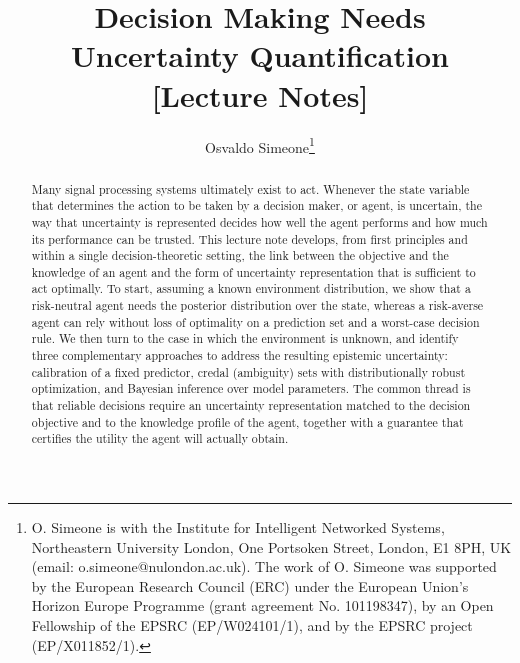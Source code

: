 \documentclass[journal]{IEEEtran}
\theoremstyle{definition}
\theoremstyle{remark}
\begin{document}
\title{Decision Making Needs Uncertainty Quantification [Lecture Notes]}
\author{Osvaldo Simeone\thanks{O. Simeone is with the Institute for Intelligent Networked Systems, Northeastern University London, One Portsoken Street, London, E1 8PH, UK (email:  o.simeone@nulondon.ac.uk). The work of O. Simeone was supported by the European Research Council (ERC) under the European Union’s Horizon Europe Programme (grant agreement No. 101198347), by an Open Fellowship of the EPSRC (EP/W024101/1), and by the EPSRC project (EP/X011852/1). }}


\maketitle

\begin{abstract}
Many signal processing systems ultimately exist to {act}. Whenever the state variable that
determines the action to be taken by a decision maker, or agent, is uncertain, the way that uncertainty is
represented decides how
well the agent performs and how much its performance can be trusted. This
lecture note develops, from first principles and within a single 
decision-theoretic setting, the link between the {objective} and the knowledge of an agent and the form of uncertainty representation that is
sufficient to act optimally. To start, assuming a known environment distribution, we show that a risk-neutral agent needs the
posterior distribution over the state, whereas a risk-averse
agent can rely without loss of optimality on a {prediction set} and a worst-case decision rule. We then
turn to the  case in which the environment is unknown, and
identify three complementary approaches to address  the resulting epistemic
uncertainty: calibration of a fixed predictor, credal (ambiguity) sets with
distributionally robust optimization, and Bayesian inference over model
parameters. The common thread is that reliable decisions require an
uncertainty representation matched to the decision objective and to the knowledge profile of the agent,  together with
a guarantee that certifies the utility the agent
will actually obtain.
\end{abstract}

\end{document}
